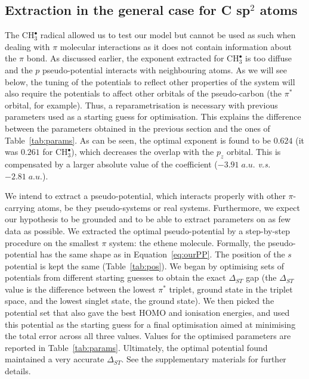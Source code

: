 \documentclass[aip]{revtex4-1}
\begin{document}
\subsection{Extraction in the general case for C sp$^2$ atoms}
\label{section:csp2_extraction}
The CH$_3^\bullet$ radical allowed us to test our model but cannot be used
as such when dealing with $\pi$ molecular interactions as it does not contain
information about the $\pi$ bond.
As discussed earlier, the exponent extracted for CH$_3^\bullet$ is too diffuse
and the $p$ pseudo-potential interacts with neighbouring atoms. As we will see below, the tuning of the potentials to reflect other properties of the system will also require the potentials to affect other orbitals of the pseudo-carbon (the $\pi^{*}$ orbital, for example).
Thus, a reparametrisation is necessary with previous parameters used as a starting guess for optimisation.
This explains the difference between the parameters obtained in the previous
section and the ones of Table~\ref{tab:params}.
As can be seen, the optimal exponent is found to be $0.624$ (it was $0.261$ for
CH$_3^\bullet$), which decreases the overlap with the $p_z$ orbital.
This is compensated by a larger absolute value of the coefficient ($-3.91\;a.u.$ \textsl{v.s.} $-2.81\;a.u.$).

We intend to extract a pseudo-potential, which interacts properly with 
other $\pi$-carrying atoms, be they pseudo-systems or real systems.
Furthermore, we expect our hypothesis to be grounded and to be able to
extract parameters on as few data as possible.
We extracted the optimal pseudo-potential by a step-by-step procedure on the smallest $\pi$ system: the ethene molecule.
Formally, the pseudo-potential has the same shape as in Equation~\ref{eq:ourPP}.
The position of the $s$ potential is kept the same (Table~\ref{tab:pos}).
We began by optimising sets of potentials from different starting guesses to obtain the exact $\Delta_{ST}$ gap (the $\Delta_{ST}$ value is the difference
between the lowest $\pi^*$ triplet, ground state in the triplet space, and the lowest singlet state, the ground state). We then picked the potential set that also gave the best HOMO and ionisation energies, and used this potential as the starting guess for a final optimisation aimed at minimising the total error across all three values.
Values for the optimised parameters are reported in Table~\ref{tab:params}. Ultimately, the optimal potential found maintained a very accurate $\Delta_{ST}$.
See the supplementary materials for further details.
\end{document}
